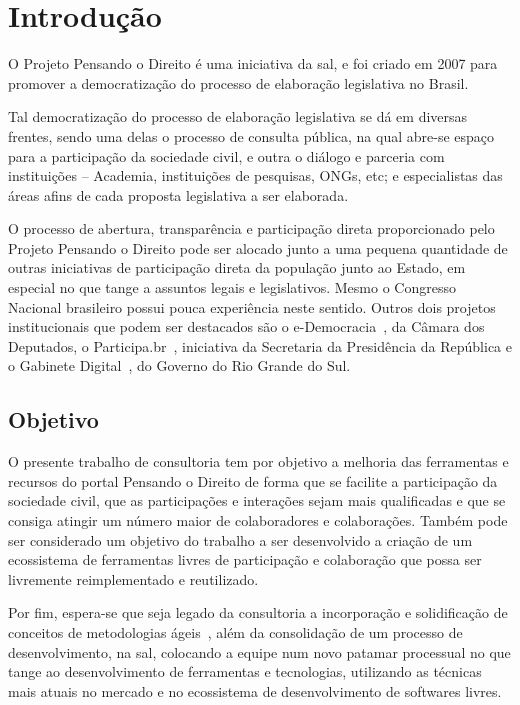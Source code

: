 \chapter{Introdução}
	O Projeto Pensando o Direito é uma iniciativa da \gls{sal}, e foi criado em 2007 para promover a democratização do processo de elaboração legislativa no Brasil.

	Tal democratização do processo de elaboração legislativa se dá em diversas frentes, sendo uma delas o processo de consulta pública, na qual abre-se espaço para a participação da sociedade civil, e outra o diálogo e parceria com instituições – Academia, instituições de pesquisas, ONGs, etc; e especialistas das áreas afins de cada proposta legislativa a ser elaborada.

	O processo de abertura, transparência e participação direta proporcionado pelo Projeto Pensando o Direito pode ser alocado junto a uma pequena quantidade de outras iniciativas de participação direta da população junto ao Estado, em especial no que tange a assuntos legais e legislativos.
Mesmo o Congresso Nacional brasileiro possui pouca experiência neste sentido.
Outros dois projetos institucionais que podem ser destacados são o e-Democracia~\cite{edemocracia}, da Câmara dos Deputados, o Participa.br~\cite{participabr}, iniciativa da Secretaria da Presidência da República e o Gabinete Digital~\cite{gabinetedigital}, do Governo do Rio Grande do Sul. 

\section{Objetivo}
O presente trabalho de consultoria tem por objetivo a melhoria das ferramentas e recursos do portal Pensando o Direito de forma que se facilite a participação da sociedade civil, que as participações e interações sejam mais qualificadas e que se consiga atingir um número maior de colaboradores e colaborações. Também pode ser considerado um objetivo do trabalho a ser desenvolvido a criação de um ecossistema de ferramentas livres de participação e colaboração que possa ser livremente reimplementado e reutilizado.

Por fim, espera-se que seja legado da consultoria a incorporação e solidificação de conceitos de metodologias ágeis~\cite{shore2007art}, além da consolidação de um processo de desenvolvimento, na \gls{sal}, colocando a equipe num novo patamar processual no que tange ao desenvolvimento de ferramentas e tecnologias, utilizando as técnicas mais atuais no mercado e no ecossistema de desenvolvimento de softwares livres.